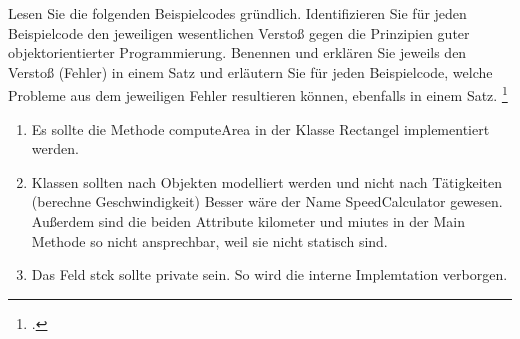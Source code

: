 \documentclass{bschlangaul-aufgabe}
\begin{document}

Lesen Sie die folgenden Beispielcodes gründlich. Identifizieren Sie für
jeden Beispielcode den jeweiligen wesentlichen Verstoß gegen die
Prinzipien guter objektorientierter Programmierung. Benennen und
erklären Sie jeweils den Verstoß (Fehler) in einem Satz und erläutern
Sie für jeden Beispielcode, welche Probleme aus dem jeweiligen Fehler
resultieren können, ebenfalls in einem Satz.
\footcite{examen:66116:2021:03}

\begin{enumerate}
\item {}

\begin{bAntwort}
Es sollte die Methode computeArea in der Klasse Rectangel implementiert
werden.
\end{bAntwort}

\item {}

\begin{bAntwort}
Klassen sollten nach Objekten modelliert werden und nicht nach
Tätigkeiten (berechne Geschwindigkeit) Besser wäre der Name
SpeedCalculator gewesen. Außerdem sind die beiden Attribute kilometer
und miutes in der Main Methode so nicht ansprechbar, weil sie nicht
statisch sind.
\end{bAntwort}

\item {}

\begin{bAntwort}
Das Feld stck sollte private sein. So wird die interne Implemtation
verborgen.
\end{bAntwort}
\end{enumerate}
\end{document}
